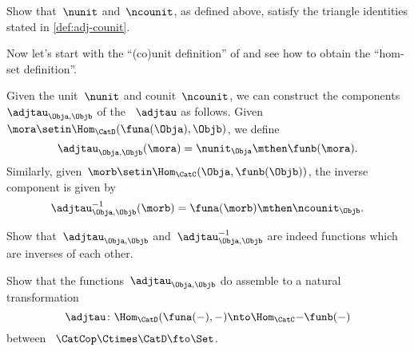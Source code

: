 \begin{solution}
    \missingsolution
\end{solution}

\begin{exercise}
    \label{ex:eta-epsilon-triangle}
    Show that~$\nunit$ and~$\ncounit$, as defined above, satisfy the triangle identities stated in \cref{def:adj-counit}.
\end{exercise}

\begin{solution}
    \missingsolution
\end{solution}

Now let's start with the ``(co)unit definition'' of  and see how to obtain the ``hom-set definition''.

Given the unit~$\nunit$ and counit~$\ncounit$, we can construct the components~$\adjtau_{\Obja,\Objb}$ of the ~$\adjtau$ as follows.
Given~$\mora \setin \Hom_{\CatD}(\funa(\Obja),\Objb)$, we define
\begin{equation}
    \adjtau_{\Obja,\Objb}(\mora) = \nunit_\Obja \mthen \funb(\mora).
\end{equation}
Similarly, given~$\morb \setin \Hom_{\CatC}(\Obja,\funb(\Objb))$, the inverse component is given by
\begin{equation}
    \adjtau_{\Obja,\Objb}^{-1}(\morb) = \funa(\morb) \mthen \ncounit_\Objb.
\end{equation}

\begin{exercise}
    \label{ex:tau}
    Show that~$\adjtau_{\Obja,\Objb}$ and~$\adjtau_{\Obja,\Objb}^{-1}$ are indeed functions which are inverses of each other.
\end{exercise}

\begin{solution}
    \missingsolution
\end{solution}

\begin{exercise}
    \label{ex:tau2}
    Show that the functions~$\adjtau_{\Obja,\Objb}$ do assemble to a natural transformation
    \begin{equation}
        \adjtau  \colon \Hom_{\CatD}(\funa(-),- ) \nto \Hom_{\CatC}{-}{\funb(-)}
    \end{equation}
    between ~$\CatCop \Ctimes \CatD \fto \Set $.
\end{exercise}

\begin{solution}
    \missingsolution
\end{solution}
